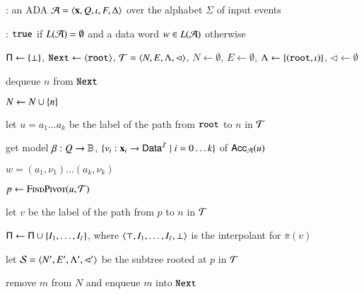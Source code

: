 \documentclass[10pt,conference,letterpaper,twocolumn]{IEEEtran}
\begin{document}
\begin{algorithm}[t!]
{\scriptsize\begin{algorithmic}[0]
: an ADA $\mathcal{A} = \left\langle \mathbf x,Q,\iota,F,\Delta \right\rangle$
over the alphabet $\Sigma$ of input events

: $\mathtt{true}$ if $L(\mathcal{A})=\emptyset$ and a data word $w
\in L(\mathcal{A})$ otherwise
\end{algorithmic}}

{\scriptsize\begin{algorithmic}[1]
  \State $\mathsf{\Pi} \leftarrow \left\{ \bot \right\}$, $\mathtt{Next} \leftarrow
  \left\langle \mathtt{root} \right\rangle$, $\mathcal{T} = \left\langle N,E,\Lambda,\lhd \right\rangle$, $N \leftarrow
  \emptyset$, $E \leftarrow \emptyset$, $\Lambda \leftarrow
  \left\{ (\mathtt{root},\iota) \right\}$, $\lhd \leftarrow \emptyset$

  \While {$\worklist \neq \emptyset$}
  \label{ln:while}
  
  \State dequeue $n$ from $\mathtt{Next}$ 

  \State $N \leftarrow N \cup \left\{ n \right\}$

   

  \State let $u = a_1\ldots a_k$ be the label of the path from
  $\mathtt{root}$ to $n$ in $\mathcal{T}$

   

  \State get model $\beta : Q \rightarrow \mathbb{B}$, $\{\nu_i :
  \mathbf x_i \rightarrow \mathsf{Data}^{\mathcal{I}} \mid i=0\ldots k\}$ of $\mathsf{Acc}_{\mathcal{A}}(u)$

   $w = (a_1,\nu_1) \ldots (a_k,\nu_k)$
  \label{ln:cex}

  \Else {}

  \State $p \leftarrow \Call{FindPivot}{u,\Art}$

  \State let $v$ be the label of the path from $p$ to $n$ in $\mathcal{T}$
  
  \State $\mathsf{\Pi} \leftarrow \mathsf{\Pi} \cup \left\{ I_1,\ldots,I_\ell \right\}$,
  where $\left\langle \top,I_1,\ldots,I_\ell,\bot \right\rangle$ is the interpolant for
  $\overline{\pi}(v)$

  \State let $\mathcal{S} = \left\langle N',E',\Lambda',\lhd' \right\rangle$ be the subtree
  rooted at $p$ in $\mathcal{T}$


  \State remove $m$ from $N$ and enqueue $m$ into $\mathtt{Next}$


\end{algorithmic}}
\end{algorithm}
\end{document}
